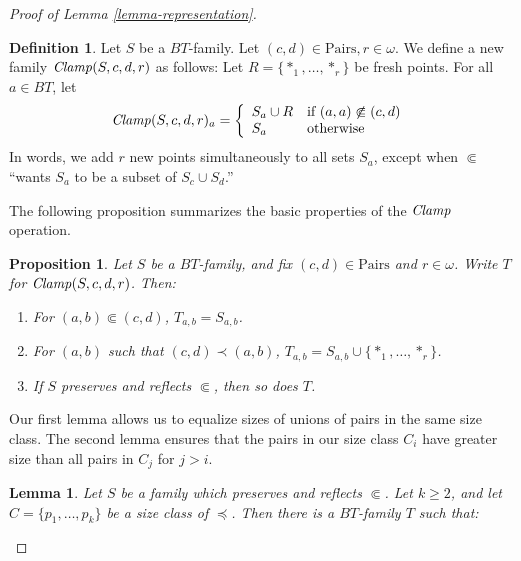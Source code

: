 \documentclass[letterpaper]{article} %
\newtheorem{lemma}[theorem]{Lemma}
\newtheorem{proposition}[theorem]{Proposition}
\theoremstyle{definition}
\newtheorem{definition}[theorem]{Definition}
\newcommand{\set}[1]{\{ #1 \}}
\newcommand{\Pairs}{\mbox{Pairs}}
\newcommand{\Clamp}{\protect{\mbox{\textit{Clamp}}}}
\newcommand{\precsubseteq}{\Subset}
\begin{document}
\begin{proof}[Proof of Lemma \ref{lemma-representation}]
\begin{definition}  Let $S$ be a $BT$-family.  Let $(c, d) \in \Pairs, r \in \omega$. 
We define a new family $\Clamp(S, c, d, r)$ as follows: 
Let $R = \set{*_1, \ldots, *_r}$ be fresh points.  For all $a \in BT$, let
\[ \begin{array}{lcl}
\Clamp(S,c,d,r)_a = \left\{
\begin{array}{ll}
S_a \cup R & \mbox{if $ (a,a) \not \precsubseteq (c,d)$}\\
 S_a & \mbox{otherwise}\\ 
 \end{array}
 \right.
\end{array}
\]
In words, we add $r$ new points
simultaneously to all sets $S_a$, except when 
$\precsubseteq$ ``wants 
$S_a$ to be a subset of  $S_c\cup S_d$.''

\end{definition}

The following proposition summarizes the basic properties
of the $\Clamp$ operation.  
\begin{proposition}
Let $S$ be a $BT$-family, and fix $(c, d) \in \Pairs$ and $r \in \omega$.  Write $T$ for $\Clamp(S, c, d, r)$.  Then:

\begin{enumerate}
    \item For $(a,b)\precsubseteq (c,d)$, $T_{a,b} = S_{a,b}$. \label{part-easy}

    \item For $(a,b)$ such that $(c,d) \prec (a,b)$, $T_{a,b} =  S_{a,b}\cup\set{*_1,\ldots, *_r}$. \label{part-bigger}

    \item If $S$ preserves and reflects $\precsubseteq$, then so does $T$. \label{part-preserve}
\end{enumerate}

\label{proposition-sClamp}

\end{proposition}

Our first lemma allows us to equalize sizes of unions of pairs in the same size class.  The second lemma ensures that the pairs in our size class $C_i$ have greater size than all pairs in 
$C_j$ for $j > i$.

\begin{lemma}

Let $S$ be a family which preserves and reflects $\precsubseteq$.  Let $k\geq 2$, and let $C = \set{p_1, \ldots, p_k}$ be a size class of  $\preceq$.  Then there is a $BT$-family $T$ such that: 


\end{lemma}
\end{proof}
\end{document}
